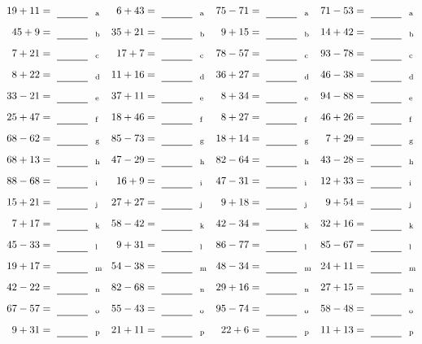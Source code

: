 \documentclass
[
  draft    = true,
  fontsize = 11pt,
  parskip  = half-
]
{scrartcl}
\begin{document}
\clearpage
\begin{align*}
    \pline{19+11}&=\rline{a}
  & \pline{6+43}&=\rline{a}
  & \pline{75-71}&=\rline{a}
  & \pline{71-53}&=\rline{a} \\[1ex]
    \pline{45+9}&=\rline{b}
  & \pline{35+21}&=\rline{b}
  & \pline{9+15}&=\rline{b}
  & \pline{14+42}&=\rline{b} \\[1ex]
    \pline{7+21}&=\rline{c}
  & \pline{17+7}&=\rline{c}
  & \pline{78-57}&=\rline{c}
  & \pline{93-78}&=\rline{c} \\[1ex]
    \pline{8+22}&=\rline{d}
  & \pline{11+16}&=\rline{d}
  & \pline{36+27}&=\rline{d}
  & \pline{46-38}&=\rline{d} \\[1ex]
    \pline{33-21}&=\rline{e}
  & \pline{37+11}&=\rline{e}
  & \pline{8+34}&=\rline{e}
  & \pline{94-88}&=\rline{e} \\[1ex]
    \pline{25+47}&=\rline{f}
  & \pline{18+46}&=\rline{f}
  & \pline{8+27}&=\rline{f}
  & \pline{46+26}&=\rline{f} \\[1ex]
    \pline{68-62}&=\rline{g}
  & \pline{85-73}&=\rline{g}
  & \pline{18+14}&=\rline{g}
  & \pline{7+29}&=\rline{g} \\[1ex]
    \pline{68+13}&=\rline{h}
  & \pline{47-29}&=\rline{h}
  & \pline{82-64}&=\rline{h}
  & \pline{43-28}&=\rline{h} \\[1ex]
    \pline{88-68}&=\rline{i}
  & \pline{16+9}&=\rline{i}
  & \pline{47-31}&=\rline{i}
  & \pline{12+33}&=\rline{i} \\[1ex]
    \pline{15+21}&=\rline{j}
  & \pline{27+27}&=\rline{j}
  & \pline{9+18}&=\rline{j}
  & \pline{9+54}&=\rline{j} \\[1ex]
    \pline{7+17}&=\rline{k}
  & \pline{58-42}&=\rline{k}
  & \pline{42-34}&=\rline{k}
  & \pline{32+16}&=\rline{k} \\[1ex]
    \pline{45-33}&=\rline{l}
  & \pline{9+31}&=\rline{l}
  & \pline{86-77}&=\rline{l}
  & \pline{85-67}&=\rline{l} \\[1ex]
    \pline{19+17}&=\rline{m}
  & \pline{54-38}&=\rline{m}
  & \pline{48-34}&=\rline{m}
  & \pline{24+11}&=\rline{m} \\[1ex]
    \pline{42-22}&=\rline{n}
  & \pline{82-68}&=\rline{n}
  & \pline{29+16}&=\rline{n}
  & \pline{27+15}&=\rline{n} \\[1ex]
    \pline{67-57}&=\rline{o}
  & \pline{55-43}&=\rline{o}
  & \pline{95-74}&=\rline{o}
  & \pline{58-48}&=\rline{o} \\[1ex]
    \pline{9+31}&=\rline{p}
  & \pline{21+11}&=\rline{p}
  & \pline{22+6}&=\rline{p}
  & \pline{11+13}&=\rline{p}
\end{align*}
\end{document}

